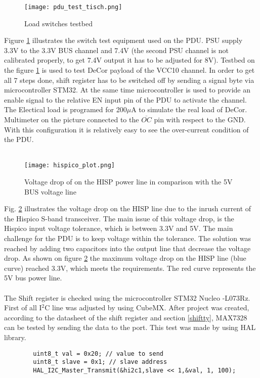 \begin{figure}[h]
 	\centering
 	\texttt{[image: pdu\_test\_tisch.png]}
 	\caption{Load switches testbed}
 	\label{fig: pdu_test_tisch}
 \end{figure}

Figure \ref{fig: pdu_test_tisch} illustrates the switch test equipment used on the PDU. PSU supply 3.3V to the 3.3V BUS channel and 7.4V (the second PSU channel is not calibrated properly, to get 7.4V output it has to be adjusted for 8V). Testbed on the figure \ref{fig: pdu_test_tisch} is used to test DeCor payload of the VCC10 channel. In order to get all 7 steps done, shift register has to be switched off by sending a signal byte via microcontroller STM32. At the same time microcontroller is used to provide an enable signal to the relative EN input pin of the PDU to activate the channel. The Electical load is programed for 200$\mu$A to simulate the real load of DeCor. Multimeter on the picture connected to the $\overline{OC}$ pin with respect to the GND. With this configuration it is relatively easy to see the over-current condition of the PDU.\\ \\


 \begin{figure}[h]
 	\centering
 	\texttt{[image: hispico\_plot.png]}
 	\caption{Voltage drop of on the HISP power line in comparison with the 5V BUS voltage line}
 	\label{fig: oscilloscope}
 \end{figure}

Fig. \ref{fig: oscilloscope} illustrates the voltage drop on the HISP line due to the inrush current of the Hispico S-band transceiver. The main issue of this voltage drop, is the Hispico input voltage tolerance, which is between 3.3V and 5V. The main challenge for the PDU is to keep voltage within the tolerance. The solution was reached by adding two capacitors into the output line that decrease the voltage drop. As shown on figure \ref{fig: oscilloscope} the maximum voltage drop on the HISP line (blue curve) reached 3.3V, which meets the requirements. The red curve represents the 5V bus power line.\\ \\

	
		
	The	Shift register is checked using the microcontroller STM32 Nucleo -L073Rz. First of all I$^2$C line was adjusted by using CubeMX. After project was created, according to the datasheet of the shift register and section \ref{shiftty}, MAX7328 can be tested by sending the data to the port. This test was made by using HAL library.\\
		\begin{lstlisting}
		uint8_t val = 0x20; // value to send
		uint8_t slave = 0x1; // slave address
		HAL_I2C_Master_Transmit(&hi2c1,slave << 1,&val, 1, 100);
		\end{lstlisting}
	
